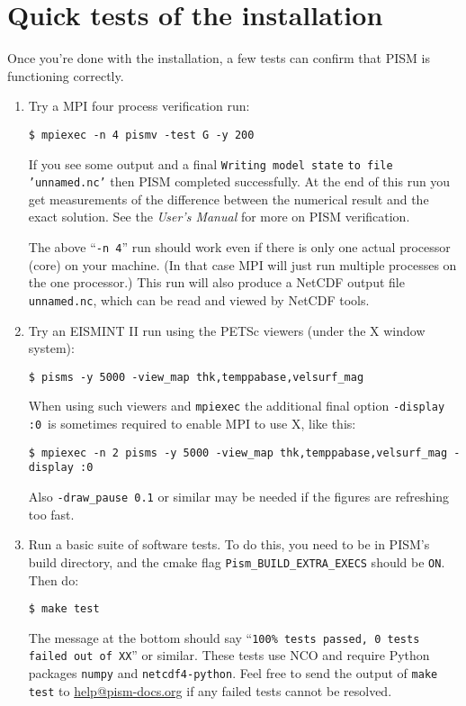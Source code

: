 \documentclass[titlepage,letterpaper,final]{scrartcl}
\begin{document}
\section{Quick tests of the installation} \label{sec:tests}
Once you're done with the installation, a few tests can confirm that PISM is functioning correctly.
\begin{enumerate}
\item Try a MPI four process verification run:

\begin{verbatim}
$ mpiexec -n 4 pismv -test G -y 200
\end{verbatim}

  \noindent If you see some output and a final \texttt{Writing model state}
  \texttt{to file 'unnamed.nc'} then PISM completed
  successfully. At the end of this run you get measurements of the difference
  between the numerical result and the exact solution. See the \emph{User's
    Manual} for more on PISM verification.

  The above ``\texttt{-n 4}'' run should work even if there is only one actual
  processor (core) on your machine.  (In that case MPI will just run multiple
  processes on the one processor.)  This run will also produce a NetCDF output
  file \texttt{unnamed.nc}, which can be read and viewed by NetCDF tools.

\item Try an EISMINT II run using the PETSc viewers (under the X window system):

\begin{verbatim}
$ pisms -y 5000 -view_map thk,temppabase,velsurf_mag
\end{verbatim}

  \noindent When using such viewers and \texttt{mpiexec} the additional final
  option \texttt{-display :0} \,is sometimes required to enable MPI to use X,
  like this:

\begin{verbatim}
$ mpiexec -n 2 pisms -y 5000 -view_map thk,temppabase,velsurf_mag -display :0
\end{verbatim}

\noindent Also \texttt{-draw_pause 0.1} or similar may be needed if the figures
are refreshing too fast.

\item Run a basic suite of software tests.  To do this, you need to be in PISM's
build directory, and the cmake flag \texttt{Pism_BUILD_EXTRA_EXECS} should be
\texttt{ON}.  Then do:
\begin{verbatim}
$ make test
\end{verbatim}
The message at the bottom should say ``\texttt{100\% tests passed, 0 tests
failed out of XX}'' or similar.  These tests use NCO and require
Python packages \texttt{numpy} and \texttt{netcdf4-python}.  Feel free to
send the output of \texttt{make test} to
\href{mailto:help@pism-docs.org}{help@pism-docs.org} if any failed tests cannot
be resolved.
\end{enumerate}
\end{document}
